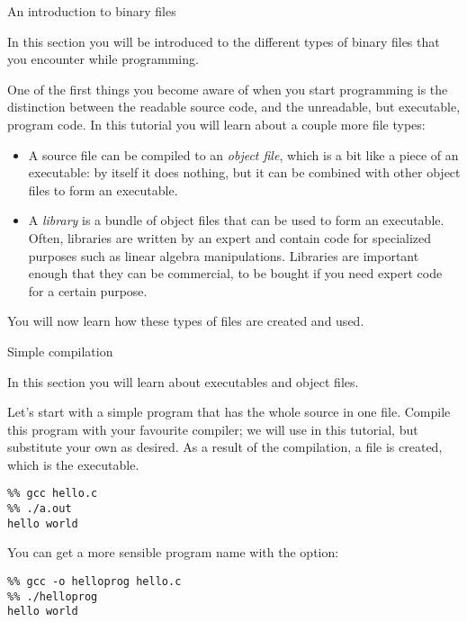  {An introduction to binary files}

\begin{purpose}
  In this section you will be introduced to the different types of
  binary files that you encounter while programming.
\end{purpose}

One of the first things you become aware of when you start programming
is the distinction between the readable source code, and the
unreadable, but executable, program code. In this tutorial you will
learn about a couple more file types:
\begin{itemize}
\item A source file can be compiled to an \emph{object file}, which is
  a bit like a piece of an executable: by itself it does nothing, but
  it can be combined with other object files to form an executable.
\item A \emph{library} is a bundle of object files that can be used to
  form an executable. Often, libraries are written by an expert and
  contain code for specialized purposes such as linear algebra
  manipulations. Libraries are important enough that they can be
  commercial, to be bought if you need expert code for a certain purpose.
\end{itemize}
You will now learn how these types of files are created and used.

 {Simple compilation}

\begin{purpose}
  In this section you will learn about executables and object files.
\end{purpose}

Let's start with a simple program that has the whole source in one
file.
Compile this program with your favourite compiler; we will use 
in this tutorial, but substitute your own as desired. As a result of
the compilation, a file  is created, which is the executable.
\begin{verbatim}
%% gcc hello.c
%% ./a.out
hello world
\end{verbatim}
You can get a more sensible program name with the  option:
\begin{verbatim}
%% gcc -o helloprog hello.c
%% ./helloprog
hello world
\end{verbatim}

